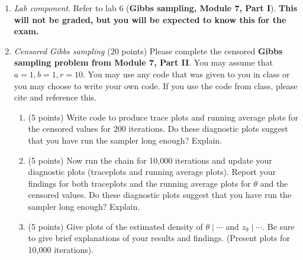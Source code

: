 \documentclass{article}
\begin{document}
\begin{enumerate}
\item \emph{Lab component}. Refer to lab 6 (\textbf{Gibbs sampling, Module 7, Part I}). \textbf{This will not be graded, but you will be expected to know this for the exam.}

\item \emph{Censored Gibbs sampling} (20 points) Please complete the censored \textbf{Gibbs sampling problem from Module 7, Part II}. You may assume that $a=1,b=1, r=10.$ You may use any code that was given to you in class or you may choose to write your own code. If you use the code from class, please cite and reference this.

\begin{enumerate}
\item (5 points) Write code to produce trace plots and running average plots for the censored values for 200 iterations. Do these diagnostic plots suggest that you have run the sampler long enough? Explain. 

\item (5 points) Now run the chain for 10,000 iterations  and update your diagnostic plots (traceplots and running average plots). Report your findings for both traceplots and the running average plots for $\theta$ and the censored values. Do these diagnostic plots suggest that you have run the sampler long enough? Explain. 

\item (5 points) Give plots of the estimated density of $\theta \mid \cdots$ and $z_9 \mid \cdots$. Be sure to give brief explanations of your results and findings. (Present plots for 10,000 iterations). 


\end{enumerate}
\end{enumerate}
\end{document}
